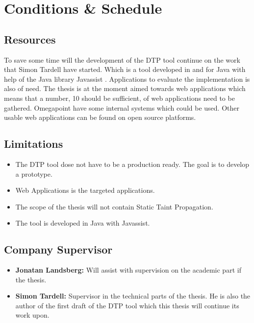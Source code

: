 \documentclass{../kththesis}
\begin{document}
\chapter{Conditions \& Schedule}
\section{Resources}
To save some time will the development of the DTP tool continue on the work that Simon Tardell have started. Which is a tool developed in and for Java with help of the Java library Javassist \parencite{javassist}. Applications to evaluate the implementation is also of need. The thesis is at the moment aimed towards web applications which means that a number, 10 should be sufficient, of web applications need to be gathered. Omegapoint have some internal systems which could be used. Other usable web applications can be found on open source platforms.


\section{Limitations}
\begin{itemize}  
	\item The DTP tool dose not have to be a production ready. The goal is to develop a prototype.
	\item Web Applications is the targeted applications.
	\item The scope of the thesis will not contain Static Taint Propagation.
	\item The tool is developed in Java with Javassist.
\end{itemize}


\section{Company Supervisor}
\begin{itemize}
	\item \textbf{Jonatan Landsberg:} Will assist with supervision on the academic part if the thesis.
	\item \textbf{Simon Tardell:} Supervisor in the technical parts of the thesis. He is also the author of the first draft of the DTP tool which this thesis will continue its work upon. 
\end{itemize}
\end{document}
